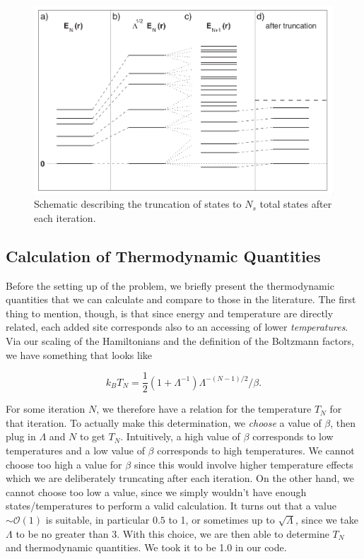 \begin{figure}
  \centering
  \includegraphics[width=0.6\linewidth]{./gfx/truncation.png}
  \caption{Schematic describing the truncation of states to $N_s$ total states after each iteration.}
  \label{fig:4-nrg-truncation}
\end{figure}


\subsection{Calculation of Thermodynamic Quantities}

Before the setting up of the problem, we briefly present the thermodynamic quantities that we can calculate and compare to those in the literature. The first thing to mention, though, is that since energy and temperature are directly related, each added site corresponds also to an accessing of lower \textit{temperatures}. Via our scaling of the Hamiltonians and the definition of the Boltzmann factors, we have something that looks like

\begin{equation}
  k_B T_N = \frac{1}{2}(1 + \Lambda^{-1})\Lambda^{-(N-1)/2} / \beta.
\end{equation}

For some iteration $N$, we therefore have a relation for the temperature $T_N$ for that iteration. To actually make this determination, we \textit{choose} a value of $\beta$, then plug in $\Lambda$ and $N$ to get $T_N$. Intuitively, a high value of $\beta$ corresponds to low temperatures and a low value of $\beta$ corresponds to high temperatures. We cannot choose too high a value for $\beta$ since this would involve higher temperature effects which we are deliberately truncating after each iteration. On the other hand, we cannot choose too low a value, since we simply wouldn't have enough states/temperatures to perform a valid calculation. It turns out that a value $\sim\mathcal{O}(1)$ is suitable, in particular $0.5$ to 1, or sometimes up to $\sqrt{\Lambda}$, since we take $\Lambda$ to be no greater than 3. With this choice, we are then able to determine $T_N$ and thermodynamic quantities. We took it to be 1.0 in our code.

